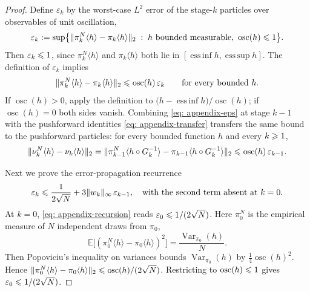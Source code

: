 \documentclass{article}
\begin{document}
\begin{proof}
Define $\varepsilon_k$ by the worst-case $L^2$ error of the stage-$k$ particles over observables of unit oscillation,
\begin{equation}
    \varepsilon_k := \sup\bigl\{\lVert\pi_k^N\langle h\rangle-\pi_k\langle h\rangle\rVert_2
    \;:\; h\text{ bounded measurable},\ \operatorname{osc}(h)\leqslant1\bigr\} .
    \label{eq: appendix-eps-def}
\end{equation}
Then $\varepsilon_k\leqslant1$, since $\pi_k^N\langle h\rangle$ and $\pi_k\langle h\rangle$ both lie in $[\operatorname{ess\,inf}h,\operatorname{ess\,sup}h]$. The definition of $\varepsilon_k$ implies
\begin{equation}
    \lVert\pi_k^N\langle h\rangle-\pi_k\langle h\rangle\rVert_2 \leqslant \operatorname{osc}(h)\,\varepsilon_k
    \qquad\text{for every bounded } h.
    \label{eq: appendix-eps}
\end{equation}
If $\operatorname{osc}(h)>0$, apply the definition to $\bigl(h-\operatorname{ess\,inf}h\bigr)/\operatorname{osc}(h)$; if $\operatorname{osc}(h)=0$ both sides vanish.
Combining \eqref{eq: appendix-eps} at stage $k-1$ with the pushforward identities \eqref{eq: appendix-transfer} transfers the same bound to the pushforward particles: for every bounded function $h$ and every $k\geqslant1$,
\begin{equation}
    \lVert\nu_k^N\langle h\rangle-\nu_k\langle h\rangle\rVert_2
    = \lVert\pi_{k-1}^N\langle h\circ G_k^{-1}\rangle-\pi_{k-1}\langle h\circ G_k^{-1}\rangle\rVert_2
    \leqslant \operatorname{osc}(h)\,\varepsilon_{k-1} .
    \label{eq: appendix-transferred}
\end{equation}

Next we prove the error-propagation recurrence
\begin{equation}
    \varepsilon_k \leqslant \frac{1}{2\sqrt N} + 3\lVert w_k\rVert_\infty\,\varepsilon_{k-1},
    \quad\text{with the second term absent at } k=0 .
    \label{eq: appendix-recursion}
\end{equation}
At $k=0$, \eqref{eq: appendix-recursion} reads $\varepsilon_0\leqslant1/(2\sqrt N)$. Here $\pi_0^N$ is the empirical measure of $N$ independent draws from $\pi_0$,
\begin{equation*}
    \mathbb E\bigl[(\pi_0^N\langle h\rangle-\pi_0\langle h\rangle)^{2}\bigr]
    = \frac{\operatorname{Var}_{\pi_0}(h)}{N} .
\end{equation*}
Then Popoviciu's inequality on variances \citep{popoviciu1935equations} bounds $\operatorname{Var}_{\pi_0}(h)$ by $\frac14\operatorname{osc}(h)^2$. Hence $\lVert\pi_0^N\langle h\rangle-\pi_0\langle h\rangle\rVert_2 \leqslant \operatorname{osc}(h)/(2\sqrt N)$. Restricting to $\operatorname{osc}(h)\leqslant1$ gives $\varepsilon_0\leqslant 1/(2\sqrt N)$.


\end{proof}
\end{document}
